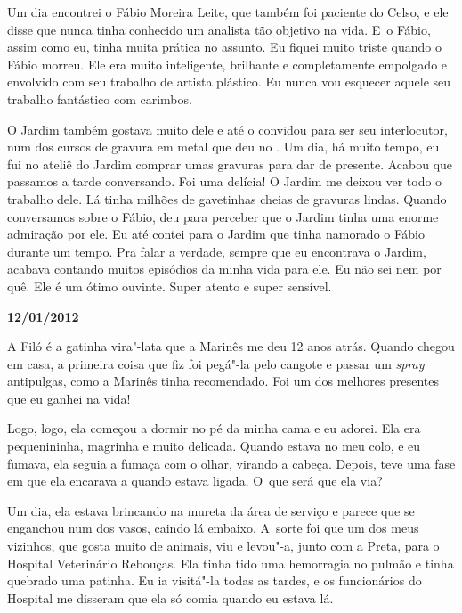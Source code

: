 Um dia encontrei o Fábio Moreira Leite, que também foi paciente do
Celso, e ele disse que nunca tinha conhecido um analista tão objetivo na
vida. E~o Fábio, assim como eu, tinha muita prática no assunto. Eu
fiquei muito triste quando o Fábio morreu. Ele era muito inteligente,
brilhante e completamente empolgado e envolvido com seu trabalho de
artista plástico. Eu nunca vou esquecer aquele seu trabalho fantástico
com carimbos.

O Jardim também gostava muito dele e até o convidou para ser seu
interlocutor, num dos cursos de gravura em metal que deu no . Um
dia, há muito tempo, eu fui no ateliê do Jardim comprar umas gravuras
para dar de presente. Acabou que passamos a tarde conversando. Foi uma
delícia! O Jardim me deixou ver todo o trabalho dele. Lá tinha milhões
de gavetinhas cheias de gravuras lindas. Quando conversamos sobre o
Fábio, deu para perceber que o Jardim tinha uma enorme admiração por
ele. Eu até contei para o Jardim que tinha namorado o Fábio durante um
tempo. Pra falar a verdade, sempre que eu encontrava o Jardim, acabava
contando muitos episódios da minha vida para ele. Eu não sei nem por
quê. Ele é um ótimo ouvinte. Super atento e super sensível.

\begin{center}\asterisc{}\end{center}


\begin{flushright}\textbf{12/01/2012}\end{flushright}


A Filó é a gatinha vira"-lata que a Marinês me deu 12 anos atrás. Quando
chegou em casa, a primeira coisa que fiz foi pegá"-la pelo cangote e
passar um \emph{spray} antipulgas, como a Marinês tinha recomendado. Foi
um dos melhores presentes que eu ganhei na vida!

Logo, logo, ela começou a dormir no pé da minha cama e eu adorei. Ela
era pequenininha, magrinha e muito delicada. Quando estava no meu colo,
e eu fumava, ela seguia a fumaça com o olhar, virando a cabeça. Depois,
teve uma fase em que ela encarava a  quando estava ligada. O~que será
que ela via?

Um dia, ela estava brincando na mureta da área de serviço e parece que
se enganchou num dos vasos, caindo lá embaixo. A~sorte foi que um dos
meus vizinhos, que gosta muito de animais, viu e levou"-a, junto com a
Preta, para o Hospital Veterinário Rebouças. Ela tinha tido uma
hemorragia no pulmão e tinha quebrado uma patinha. Eu ia visitá"-la todas
as tardes, e os funcionários do Hospital me disseram que ela só comia
quando eu estava lá.

